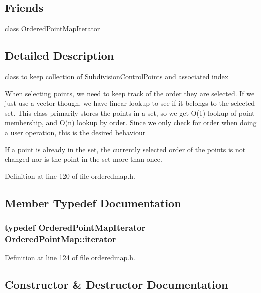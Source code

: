 \subsection*{Friends}
\begin{DoxyCompactItemize}
\item 
class \hyperlink{classOrderedPointMap_a7bb53502d3b4a6a62a846b20b2192e6b}{Ordered\+Point\+Map\+Iterator}
\end{DoxyCompactItemize}


\subsection{Detailed Description}
class to keep collection of Subdivision\+Control\+Points and associated index 

When selecting points, we need to keep track of the order they are selected. If we just use a vector though, we have linear lookup to see if it belongs to the selected set. This class primarily stores the points in a set, so we get O(1) lookup of point membership, and O(n) lookup by order. Since we only check for order when doing a user operation, this is the desired behaviour

If a point is already in the set, the currently selected order of the points is not changed nor is the point in the set more than once. 

Definition at line 120 of file orderedmap.\+h.



\subsection{Member Typedef Documentation}
\subsubsection[{\texorpdfstring{iterator}{iterator}}]{\setlength{\rightskip}{0pt plus 5cm}typedef {\bf Ordered\+Point\+Map\+Iterator} {\bf Ordered\+Point\+Map\+::iterator}}\hypertarget{classOrderedPointMap_ae58ae7176ea9345af14a8f53bbe57d69}{}\label{classOrderedPointMap_ae58ae7176ea9345af14a8f53bbe57d69}


Definition at line 124 of file orderedmap.\+h.



\subsection{Constructor \& Destructor Documentation}
